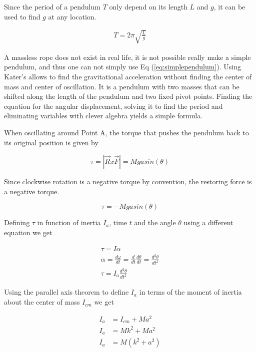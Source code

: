 \documentclass[12pt]{article}
\begin{document}
Since the period of a pendulum $T$ only depend on its length $L$  and $g$, it can be used to find $g$ at any location.

\begin{gather}
    T=2\pi\sqrt{\frac{L}{g}} \label{eq:simplependulum}
\end{gather}

A massless rope does not exist in real life, it is not possible really make a simple pendulum, and thus one can not simply use Eq (\ref{eq:simplependulum}). Using Kater’s allows to find the gravitational acceleration without finding the center of mass and center of oscillation. It is a pendulum with two masses that can be shifted along the length of the pendulum and two fixed pivot points. Finding the equation for the angular displacement, solving it to find the period and eliminating variables with clever algebra yields a simple formula.

When oscillating around Point A, the torque that pushes the pendulum back to its original position is given by

\begin{equation}\tau=|\vec{ R } x \vec{ F }| = Mgasin\left(\theta\right)\end{equation}

Since clockwise rotation is a negative torque by convention, the restoring force is a negative torque.

\begin{equation}
    \tau=-Mgasin\left(\theta\right)
\end{equation}

Defining $\tau$ in function of inertia $I_a$, time $t$ and the angle $\theta$ using a different equation we get

\begin{equation}
    \begin{gathered}
        \tau=I\alpha \\
        \alpha=\frac{d\omega}{dt}=\frac{d}{dt}\frac{d\theta}{dt}=\frac{d^2\theta}{dt^2}\\
        \tau=I_a\frac{d^2\theta}{dt^2} \label{eq:torque1}
    \end{gathered}
\end{equation}

Using the parallel axis theorem to define $I_a$ in terms of the moment of inertia about the center of mass $I_{cm}$ we get

\begin{equation}
    \begin{aligned}
        I_a&=I_{cm} + Ma^2\\ 
        I_a&=Mk^2 + Ma^2\\ 
        I_a&= M(k^2+a^2) \label{eq:torque2}
    \end{aligned}
\end{equation}
\end{document}
